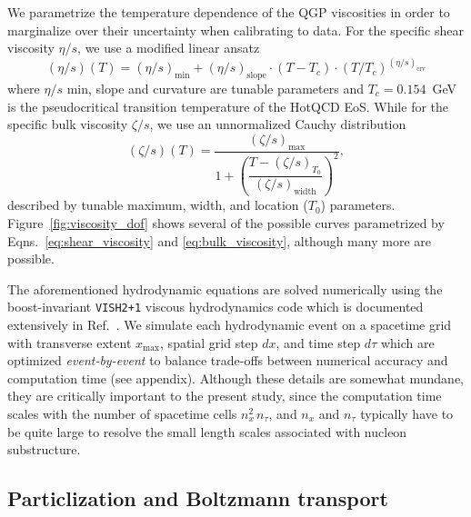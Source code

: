 \documentclass[aps,prc,reprint,amsmath,nofootinbib]{revtex4-1}
\begin{document}
We parametrize the temperature dependence of the QGP viscosities in order to marginalize over their uncertainty when calibrating to data.
For the specific shear viscosity $\eta/s$, we use a modified linear ansatz
\begin{equation}
  \label{eq:shear_viscosity}
  (\eta/s)(T) = (\eta/s)_\mathrm{min} + (\eta/s)_\mathrm{slope}\cdot(T - T_c)\cdot(T/T_c)^{(\eta/s)_\mathrm{crv}}
\end{equation}
where $\eta/s$ min, slope and curvature are tunable parameters and $T_c=0.154$~GeV is the pseudocritical transition temperature of the HotQCD EoS.
While for the specific bulk viscosity $\zeta/s$, we use an unnormalized Cauchy distribution
\begin{equation}
  \label{eq:bulk_viscosity}
  (\zeta/s)(T) = \frac{(\zeta/s)_\mathrm{max}}{1 + \left(\dfrac{T - (\zeta/s)_{T_0}}{(\zeta/s)_\mathrm{width}}\right)^2},
\end{equation}
described by tunable maximum, width, and location ($T_0$) parameters.
Figure~\ref{fig:viscosity_dof} shows several of the possible curves parametrized by Eqns.~\eqref{eq:shear_viscosity} and \eqref{eq:bulk_viscosity}, although many more are possible.

The aforementioned hydrodynamic equations are solved numerically using the boost-invariant \texttt{VISH2+1} viscous hydrodynamics code \cite{Song:2007ux} which is documented extensively in Ref.~\cite{Shen:2014vra}.
We simulate each hydrodynamic event on a spacetime grid with transverse extent $x_\mathrm{max}$, spatial grid step $dx$, and time step $d\tau$ which are optimized \emph{event-by-event} to balance trade-offs between numerical accuracy and computation time (see appendix).
Although these details are somewhat mundane, they are critically important to the present study, since the computation time scales with the number of spacetime cells $n_x^2\, n_\tau$, and $n_x$ and $n_\tau$ typically have to be quite large to resolve the small length scales associated with nucleon substructure.

\subsection{Particlization and Boltzmann transport}
\end{document}
